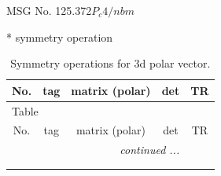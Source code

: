 \documentclass[fleqn,8pt]{jsarticle}
\begin{document}
\setcounter{MaxMatrixCols}{32}

\renewcommand{\tablename}{Table~}
\renewcommand{\figurename}{Figure~}
\begin{center}
\LARGE
MSG No. 125.372\quad$P_{c}4/nbm$
\end{center}
* symmetry operation
\renewcommand{\arraystretch}{1.3}
\begin{longtable}{ccccc}
\caption{Symmetry operations for 3d polar vector.}
 \\
 \hline \hline
No. & tag & matrix (polar) & det & TR \\ \hline \endfirsthead

\multicolumn{4}{l}{\tablename\ \thetable{}} \\
 \hline \hline
No. & tag & matrix (polar) & det & TR \\ \hline \endhead

 \hline \hline
\multicolumn{4}{r}{\footnotesize\it continued ...} \\ \endfoot

 \hline \hline
\multicolumn{4}{r}{} \\ \endlastfoot


\end{longtable}
\end{document}
